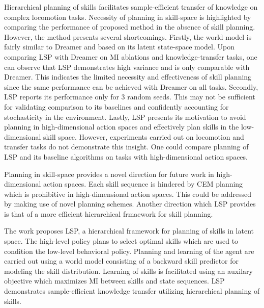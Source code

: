 \documentclass[11pt,letterpaper]{article}
\begin{document}
Hierarchical planning of skills facilitates sample-efficient transfer of knowledge on complex locomotion tasks. Necessity of planning in skill-space is highlighted by comparing the performance of proposed method in the absence of skill planning. However, the method presents several shortcomings. Firstly, the world model is fairly similar to Dreamer and based on its latent state-space model. Upon comparing LSP with Dreamer on MI ablations and knowledge-transfer tasks, one can observe that LSP demonstrates high variance and is only comparable with Dreamer. This indicates the limited necessity and effectiveness of skill planning since the same performance can be achieved with Dreamer on all tasks. Secondly, LSP reports its performance only for 3 random seeds. This may not be sufficient for validating comparison to its baselines and confidently accounting for stochasticity in the environment. Lastly, LSP presents its motivation to avoid planning in high-dimensional action spaces and effectively plan skills in the low-dimensional skill space. However, experiments carried out on locomotion and transfer tasks do not demonstrate this insight. One could compare planning of LSP and its baseline algorithms on tasks with high-dimensional action spaces. 

Planning in skill-space provides a novel direction for future work in high-dimensional action spaces. Each skill sequence is hindered by CEM planning which is prohibitive in high-dimensional action spaces. This could be addressed by making use of novel planning schemes. Another direction which LSP provides is that of a more efficient hierarchical frmaework for skill planning. 

The work proposes LSP, a hierarchical framework for planning of skills in latent space. The high-level policy plans to select optimal skills which are used to condition the low-level behavioral policy. Planning and learning of the agent are carried out using a world model consisting of a backward skill predictor for modeling the skill distribution. Learning of skills is facilitated using an auxilary objective which maximizes MI between skills and state sequences. LSP demonstrates sample-efficient knowledge transfer utilizing hierarchical planning of skills.  
\end{document}
